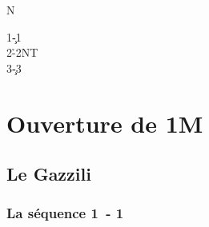 \documentclass[a4paper]{article}
\begin{document}
\dealdiagramenw
{}
{}
{}
{N}

\begin{bidtable}
1\c-1\s\\
2\h-2NT\\
3\c-3\s
\end{bidtable}

\section{Ouverture de 1M}

\subsection{Le Gazzili}

\subsubsection{La séquence 1\pdfh\ - 1\pdfs}
\end{document}
